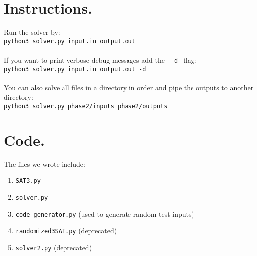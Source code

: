 \documentclass{article}
\theoremstyle{plain}
\numberwithin{theorem}{subsection}
\theoremstyle{definition}
\numberwithin{equation}{subsection}
\begin{document}
\section{Instructions.}
Run the solver by:\\
\texttt{python3 solver.py input.in output.out} \\\\
If you want to print verbose debug messages add the \texttt{ -d } flag: \\
\texttt{python3 solver.py input.in output.out -d} \\\\
You can also solve all files in a directory in order and pipe the outputs to another directory:\\
\texttt{python3 solver.py phase2/inputs phase2/outputs}\\

\section{Code.}
The files we wrote include: 
\begin{enumerate}
    \item \texttt{SAT3.py}
    \item \texttt{solver.py}
    \item \texttt{code\_generator.py} (used to generate random test inputs)
    \item \texttt{randomized3SAT.py} (deprecated)
    \item \texttt{solver2.py} (deprecated)
\end{enumerate}
\end{document}
